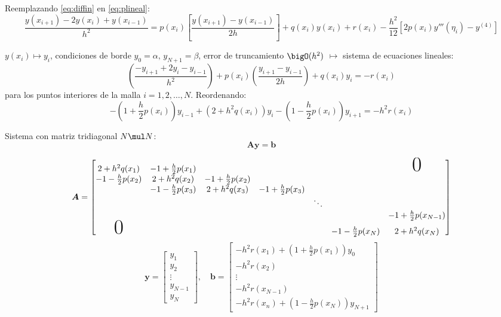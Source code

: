 \documentclass[9pt, aspectratio=169]{beamer}
\begin{document}
\begin{frame}
Reemplazando \eqref{eq:diffin} en \eqref{eq:plineal}:
\[
\frac{y(x_{i+1}) - 2 y(x_i) + y(x_{i-1})}{h^2} = p(x_{i}) \left[\frac{y(x_{i+1}) - y(x_{i-1})}{2h}\right] + q(x_i) y(x_i) + r(x_i) - \frac{h^2}{12}[2 p(x_i) y'''(\eta_i) - y^{(4)}] \]
\pause

$y(x_i) \mapsto y_i$, condiciones de borde $y_0 = \alpha, \, y_{N + 1} = \beta$, error de truncamiento $\bigO(h^2)$ $\mapsto$ sistema de ecuaciones lineales:
\[ \left(\frac{-y_{i+1} + 2 y_i - y_{i-1}}{h^2}\right) + p(x_i) \left(\frac{y_{i+1} - y_{i-1}}{2 h}\right) + q(x_i) y_i = -r(x_i) \]
para los puntos interiores de la malla $i = 1, 2, \ldots, N$. Reordenando:
\[ -\left(1 + \frac{h}{2}p(x_i)\right) y_{i-1} + \left(2 + h^2 q(x_i)\right) y_i - \left(1 - \frac{h}{2} p(x_i)\right) y_{i+1} = -h^2 r(x_i) \]

Sistema con matriz tridiagonal $N \mul N$:
\[ \bm{A} \bm{y} = \bm{b} \]
\end{frame}

\begin{frame}
    \[ \bm{A} = \begin{bmatrix}
        2 + h^2 q(x_1) & -1 + \frac{h}{2} p(x_1) & & & & & \text{\Huge 0} \\
        -1-\frac{h}{2} p(x_2) & 2 + h^2 q(x_2) & -1 +\frac{h}{2} p(x_2) & & & \\
                              & -1-\frac{h}{2} p(x_3) & 2 + h^2 q(x_3) & -1 +\frac{h}{2} p(x_3)  & & \\
                              & & & & \ddots  & & \\
                              & & && & & -1 +\frac{h}{2} p(x_{N-1}) \\
        \text{\Huge 0}              & & & & & -1 - \frac{h}{2} p(x_N) & 2 + h^2 q(x_N)
    \end{bmatrix} \]
    \[ \bm{y} = \begin{bmatrix} y_1 \\ y_2 \\ \vdots \\ y_{N-1} \\ y_N \end{bmatrix}, \quad 
    \bm{b} = \begin{bmatrix} 
        -h^2 r(x_1) + \left(1 + \frac{h}{2} p(x_1)\right) y_0 \\
        -h^2 r(x_2) \\
        \vdots \\
    -h^2 r(x_{N-1}) \\
    -h^2 r(x_n) + \left(1 - \frac{h}{2} p(x_N)\right) y_{N+1}
\end{bmatrix} 
    \]
\end{frame}
\end{document}
